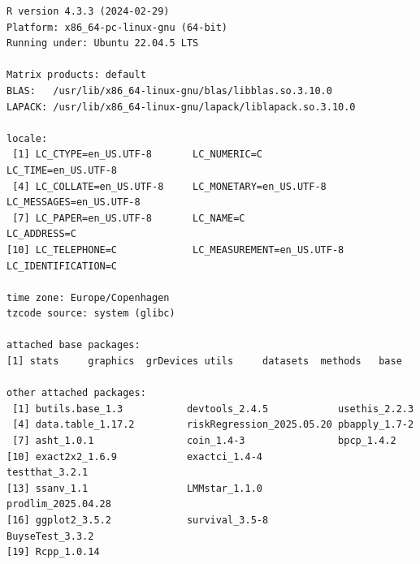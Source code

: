 \documentclass[12pt]{article}
\begin{document}
\begin{verbatim}
R version 4.3.3 (2024-02-29)
Platform: x86_64-pc-linux-gnu (64-bit)
Running under: Ubuntu 22.04.5 LTS

Matrix products: default
BLAS:   /usr/lib/x86_64-linux-gnu/blas/libblas.so.3.10.0 
LAPACK: /usr/lib/x86_64-linux-gnu/lapack/liblapack.so.3.10.0

locale:
 [1] LC_CTYPE=en_US.UTF-8       LC_NUMERIC=C               LC_TIME=en_US.UTF-8       
 [4] LC_COLLATE=en_US.UTF-8     LC_MONETARY=en_US.UTF-8    LC_MESSAGES=en_US.UTF-8   
 [7] LC_PAPER=en_US.UTF-8       LC_NAME=C                  LC_ADDRESS=C              
[10] LC_TELEPHONE=C             LC_MEASUREMENT=en_US.UTF-8 LC_IDENTIFICATION=C       

time zone: Europe/Copenhagen
tzcode source: system (glibc)

attached base packages:
[1] stats     graphics  grDevices utils     datasets  methods   base     

other attached packages:
 [1] butils.base_1.3           devtools_2.4.5            usethis_2.2.3            
 [4] data.table_1.17.2         riskRegression_2025.05.20 pbapply_1.7-2            
 [7] asht_1.0.1                coin_1.4-3                bpcp_1.4.2               
[10] exact2x2_1.6.9            exactci_1.4-4             testthat_3.2.1           
[13] ssanv_1.1                 LMMstar_1.1.0             prodlim_2025.04.28       
[16] ggplot2_3.5.2             survival_3.5-8            BuyseTest_3.3.2          
[19] Rcpp_1.0.14              


\end{verbatim}
\end{document}
